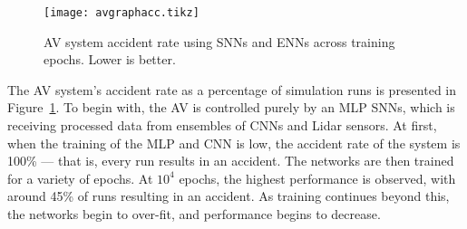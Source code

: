 






\begin{figure}[H]
	\centering
	\texttt{[image: avgraphacc.tikz]}
	\caption{\ac{AV} system accident rate using \acp{SNN} and \acp{ENN} across training epochs. Lower is better. \label{fig:avaccidents}}
	\vspace{-4mm}
\end{figure}

The \ac{AV} system's accident rate as a percentage of simulation runs is presented in Figure~\ref{fig:avaccidents}.
To begin with, the \ac{AV} is controlled purely by an \ac{MLP} \acp{SNN}, which is receiving processed data from ensembles of \acp{CNN} and Lidar sensors.
At first, when the training of the \ac{MLP} and \ac{CNN} is low, the accident rate of the system is 100\% --- that is, every run results in an accident.
The networks are then trained for a variety of epochs.
At $10^4$ epochs, the highest performance is observed, with around 45\% of runs resulting in an accident.
As training continues beyond this, the networks begin to over-fit, and performance begins to decrease. 

